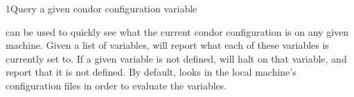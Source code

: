 \begin{ManPage}{}{1}{Query a given condor configuration variable}
\label{man-condor-config-val}
\Synopsis {}

\Description

 can be used to quickly see what the current
condor configuration is on any given machine.  Given a list of
variables,  will report what each of these
variables is currently set to.  If a given variable is not defined,
 will halt on that variable, and report that it is
not defined.  By default,  looks in the local
machine's configuration files in order to evaluate the variables.

\begin{Options}
\end{Options}

\end{ManPage}
